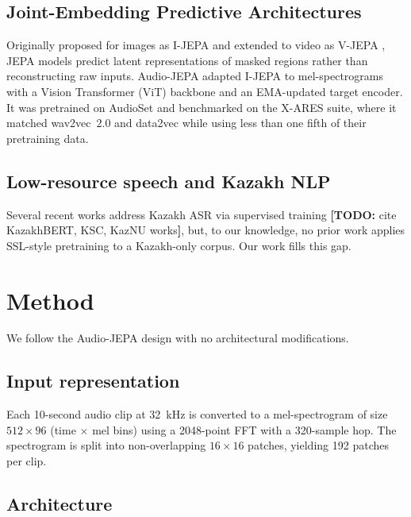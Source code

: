 \documentclass[conference]{IEEEtran}
\newcommand{\todo}[1]{{\color{red}\textbf{[TODO:} #1\textbf{]}}}
\begin{document}
\subsection{Joint-Embedding Predictive Architectures}

Originally proposed for images as I-JEPA \cite{assran2023ijepa} and extended to video as V-JEPA \cite{bardes2024vjepa}, JEPA models predict latent representations of masked regions rather than reconstructing raw inputs. Audio-JEPA \cite{tuncay2025audiojepa} adapted I-JEPA to mel-spectrograms with a Vision Transformer (ViT) backbone and an EMA-updated target encoder. It was pretrained on AudioSet and benchmarked on the X-ARES suite, where it matched wav2vec~2.0 and data2vec while using less than one fifth of their pretraining data.

\subsection{Low-resource speech and Kazakh NLP}

Several recent works address Kazakh ASR via supervised training \todo{cite KazakhBERT, KSC, KazNU works}, but, to our knowledge, no prior work applies SSL-style pretraining to a Kazakh-only corpus. Our work fills this gap.

\section{Method}

We follow the Audio-JEPA design \cite{tuncay2025audiojepa} with no architectural modifications.

\subsection{Input representation}

Each 10-second audio clip at 32~kHz is converted to a mel-spectrogram of size $512 \times 96$ (time $\times$ mel bins) using a 2048-point FFT with a 320-sample hop. The spectrogram is split into non-overlapping $16 \times 16$ patches, yielding 192 patches per clip.

\subsection{Architecture}
\end{document}
